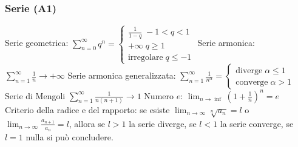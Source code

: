 \documentclass[fontsize=8pt]{scrartcl}
\begin{document}
\begin{multicols*}{4}
\subsubsection*{Serie (A1)}
Serie geometrica:\newline
$
    \sum_{n=0}^{\infty} q^n = \begin{cases}
        \frac{1}{1-q} \;-1 <q < 1\\
        + \infty \; q\geq 1\\
        \text{irregolare}\;q \leq -1
    \end{cases}
$\newline
Serie armonica:\newline
$
    \sum_{n=1}^{\infty} \frac{1}{n} \rightarrow + \infty
$\newline
Serie armonica generalizzata:\newline
$
    \sum_{n=1}^{\infty} \frac{1}{n^{\alpha}} = \begin{cases}
        \text{diverge}\; \alpha\leq 1\\
        \text{converge}\; \alpha> 1
    \end{cases}
$\newline
Serie di Mengoli $\sum_{n=1}^{\infty} \frac{1}{n(n+1)} \rightarrow  1$\newline
Numero $e$: $\lim_{n\rightarrow \inf}(1 + \frac{1}{n})^n = e$\newline
Criterio della radice e del rapporto: se esiste $\lim_{n\rightarrow \infty} \sqrt[n]{a_n} = l$ o $\lim_{n\rightarrow \infty} \frac{a_{n+1}}{a_n} = l$, allora se $l> 1$ la serie diverge, se $l< 1$ la serie converge, se $l=1$ nulla si può concludere.

\end{multicols*}
\end{document}
